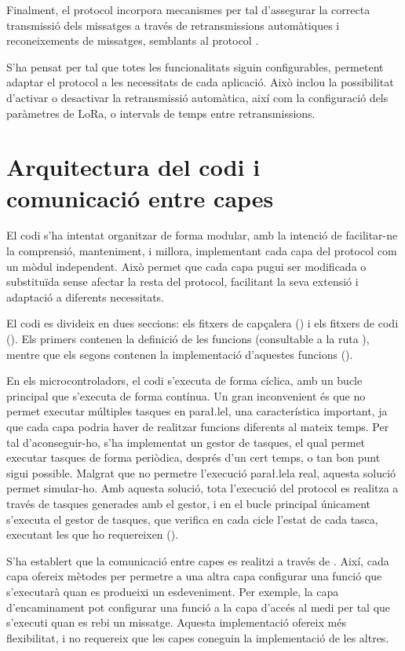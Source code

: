 \documentclass{tfgitic}[2024/07/01]
\begin{document}
Finalment, el protocol incorpora mecanismes per tal d'assegurar la correcta transmissió dels missatges a través de retransmissions automàtiques i reconeixements de missatges, semblants al protocol .

S'ha pensat per tal que totes les funcionalitats siguin configurables, permetent adaptar el protocol a les necessitats de cada aplicació. Això inclou la possibilitat d'activar o desactivar la retransmissió automàtica, així com la configuració dels paràmetres de LoRa, o intervals de temps entre retransmissions.

\section{Arquitectura del codi i comunicació entre capes}
El codi s'ha intentat organitzar de forma modular, amb la intenció de facilitar-ne la comprensió, manteniment, i millora, implementant cada capa del protocol com un mòdul independent. Això permet que cada capa pugui ser modificada o substituïda sense afectar la resta del protocol, facilitant la seva extensió i adaptació a diferents necessitats.

El codi es divideix en dues seccions: els fitxers de capçalera () i els fitxers de codi (). Els primers contenen la definició de les funcions (consultable a la ruta ), mentre que els segons contenen la implementació d'aquestes funcions ().

En els microcontroladors, el codi s'executa de forma cíclica, amb un bucle principal que s'executa de forma contínua. Un gran inconvenient és que no permet executar múltiples tasques en para\l.lel, una característica important, ja que cada capa podria haver de realitzar funcions diferents al mateix temps. Per tal d'aconseguir-ho, s'ha implementat un gestor de tasques, el qual permet executar tasques de forma periòdica, després d'un cert temps, o tan bon punt sigui possible. Malgrat que no permetre l'execució para\l.lela real, aquesta solució permet simular-ho.
Amb aquesta solució, tota l'execució del protocol es realitza a través de tasques generades amb el gestor, i en el bucle principal únicament s'executa el gestor de tasques, que verifica en cada cicle l'estat de cada tasca, executant les que ho requereixen ().

S'ha establert que la comunicació entre capes es realitzi a través de . Així, cada capa ofereix mètodes per permetre a una altra capa configurar una funció que s'executarà quan es produeixi un esdeveniment. Per exemple, la capa d'encaminament pot configurar una funció a la capa d'accés al medi per tal que s'executi quan es rebi un missatge. Aquesta implementació ofereix més flexibilitat, i no requereix que les capes coneguin la implementació de les altres.
\end{document}
